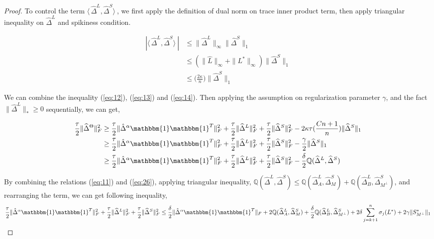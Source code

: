 \documentclass[AMS,STIX1COL]{WileyNJD-v2}
\begin{document}
{\begin{proof}
To control the term $ \langle\, \widehat\Delta^{L}, \widehat\Delta^{S} \rangle\ $, we first apply the definition of dual norm on trace inner product term, then apply triangular inequality on $\widehat{\Delta}^{L}$ and spikiness condition.

\begin{align}
    | \langle\, \widehat\Delta^{L}, \widehat\Delta^{S} \rangle\ | \nonumber
    &\leq \|\widehat{\Delta}^{L}\|_{\infty} \|\widehat{\Delta}^{S}\|_1\\ \nonumber
    &\leq (\|\widehat{L}\|_{\infty} + \|L^{*}\|_{\infty})
    \|\widehat{\Delta}^{S} \|_{1}\\
    &\leq \big(\frac{2\kappa}{n}\big)\|\widehat{\Delta}^{S} \|_{1} \label{eq:14}
\end{align}

We can combine the inequality (\ref{eq:12}), (\ref{eq:13}) and (\ref{eq:14}). Then applying the assumption on regularization parameter $\gamma$, and the fact $\|\widehat{\Delta}^{L}\|_{\ast}\geq0$ sequentially, we can get,

\begin{align}
    \frac{\tau}{2}\|\widehat{\Delta}^{\Theta}\|_{F}^{2}  \nonumber
    &\geq \frac{\tau}{2} \|\hat{\Delta}^{\alpha}\mathbbm{1}\mathbbm{1}^T\|_{F}^{2} + \frac{\tau}{2} \|\widehat{\Delta}^{L}\|_{F}^{2} + \frac{\tau}{2} \|\widehat{\Delta}^{S}\|_{F}^{2}
    - 2\kappa\tau(\frac{Cn+1}{n})\|\widehat{\Delta}^{S}\|_{1} \\ \nonumber
    &\geq \frac{\tau}{2} \|\hat{\Delta}^{\alpha}\mathbbm{1}\mathbbm{1}^T\|_{F}^{2} + \frac{\tau}{2} \|\widehat{\Delta}^{L}\|_{F}^{2} + \frac{\tau}{2} \|\widehat{\Delta}^{S}\|_{F}^{2} - \frac{\gamma}{2}\|\widehat{\Delta}^{S}\|_{1}\\
    &\geq \frac{\tau}{2} \|\hat{\Delta}^{\alpha}\mathbbm{1}\mathbbm{1}^T\|_{F}^{2} + \frac{\tau}{2} \|\widehat{\Delta}^{L}\|_{F}^{2} + \frac{\tau}{2} \|\widehat{\Delta}^{S}\|_{F}^{2} - \frac{\delta}{2} \mathbb{Q}(\widehat{\Delta}^L,\widehat{\Delta}^S) \label{eq:26}
\end{align}

By combining the relations (\ref{eq:11}) and (\ref{eq:26}), applying triangular inequality, $\mathbb{Q}(\widehat{\Delta}^L,\widehat{\Delta}^S)\leq \mathbb{Q}(\widehat{\Delta}^L_{A},\widehat{\Delta}^S_{M}) + \mathbb{Q}(\widehat{\Delta}^L_{B},\widehat{\Delta}^S_{M^{\perp}})$, and rearranging the term, we can get following inequality,
\[
    \frac{\tau}{2} \|\hat{\Delta}^{\alpha}\mathbbm{1}\mathbbm{1}^T\|_{F}^{2} + \frac{\tau}{2} \|\widehat{\Delta}^{L}\|_{F}^{2} + \frac{\tau}{2} \|\widehat{\Delta}^{S}\|_{F}^{2} \\
    \leq \frac{\delta}{2} \|\hat{\Delta}^{\alpha}\mathbbm{1}\mathbbm{1}^T\|_{F} +
    2\mathbb{Q}(\widehat{\Delta}^L_{A},\widehat{\Delta}^S_{M}) +  \frac{\delta}{2} \mathbb{Q}(\widehat{\Delta}^L_{B},\widehat{\Delta}^S_{M^\perp}) +
    2 \delta \sum_{j=k+1}^{n} \sigma_{j}(L^{*}) + 2\gamma
    \|S^{*}_{M^\perp}\|_{1}
\]


\end{proof}}
\end{document}
